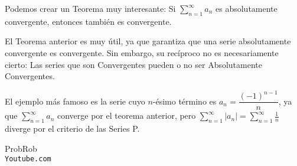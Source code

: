 \documentclass[12pt]{report}							    %
\begin{document}
    Podemos crear un Teorema muy interesante:
    Si $\sum_{n=1}^{\infty} a_n$ es absolutamente convergente, entonces también es convergente.

    El Teorema anterior es muy útil, ya que garantiza que una serie absolutamente convergente es convergente.
    Sin embargo, su recíproco no es necesariamente cierto: Las series que son Convergentes pueden o no ser Absolutamente Convergentes. 

    El ejemplo más famoso es la serie cuyo $n$-ésimo término es $a_n=\dfrac{(-1)^{n-1}}{n}$, ya que $\sum_{n=1}^{\infty}a_n$ converge por el teorema anterior, pero $\sum_{n=1}^{\infty} |a_n| = \sum_{n=1}^{\infty} \frac{1}{n}$ diverge por el criterio de las Series P.



\clearpage

	\begin{thebibliography}{9}

		ProbRob
		\\\texttt{Youtube.com}


	 

\end{thebibliography}
\end{document}
